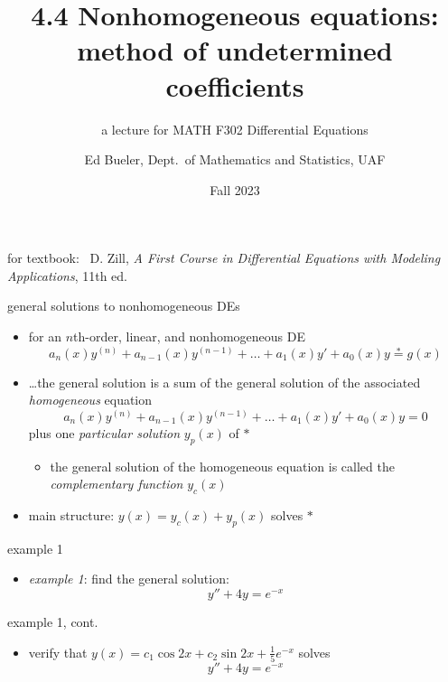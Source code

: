 \documentclass[dvipsnames]{beamer}
\title{4.4 Nonhomogeneous equations: \\ method of undetermined coefficients}
\subtitle{a lecture for MATH F302 Differential Equations}
\author{Ed Bueler, Dept.~of Mathematics and Statistics, UAF}
\date{Fall 2023}
\begin{document}


\begin{frame}
\titlepage

\centerline{\tiny for textbook: \, D. Zill, \emph{A First Course in Differential Equations with Modeling Applications}, 11th ed.}
\end{frame}


\begin{frame}{general solutions to nonhomogeneous DEs}

\begin{itemize}
\item for an $n$th-order, linear, and nonhomogeneous DE
\begin{equation*}
    a_n(x) y^{(n)} + a_{n-1}(x) y^{(n-1)} + \dots + a_1(x) y' + a_0(x) y \stackrel{\ast}{=} g(x)
\end{equation*}
\item \dots the general solution is a sum of the general solution of the associated \emph{homogeneous} equation
\begin{equation*}
    a_n(x) y^{(n)} + a_{n-1}(x) y^{(n-1)} + \dots + a_1(x) y' + a_0(x) y = 0
\end{equation*}
plus one \emph{particular solution} $y_p(x)$ of $\ast$
    \begin{itemize}
    \item the general solution of the homogeneous equation is called the \emph{complementary function} $y_c(x)$
    \end{itemize}

\bigskip
\item main structure: \alert{$y(x) = y_c(x) + y_p(x)$ solves $\ast$}
\end{itemize}
\end{frame}


\begin{frame}{example 1}

\begin{itemize}
\item \emph{example 1}: find the general solution:
    $$y'' + 4 y = e^{-x}$$
\end{itemize}

\vspace{60mm}
\end{frame}


\begin{frame}{example 1, cont.}

\begin{itemize}
\item verify that $y(x) = c_1 \cos 2x + c_2 \sin 2x + \frac{1}{5} e^{-x}$ solves
    $$y'' + 4 y = e^{-x}$$

\vspace{60mm}
\end{itemize}
\end{frame}
\end{document}
